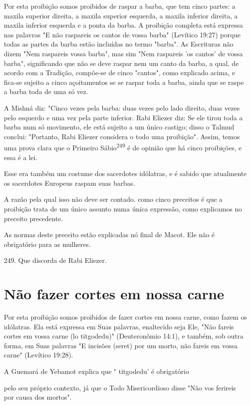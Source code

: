 \begin{itemize}
\begin{enumrate}
\begin{itemize}
\begin{itemize}
\begin{itemize}
Por esta proibição somos proibidos de raspar a barba, que tem cin­co
partes: a maxila superior direita, a maxila superior esquerda, a maxila
infe­rior direita, a maxila inferior esquerda e a ponta da barba. A
proibição comple­ta está expressa nas palavras "E não raspareis os
cantos de vossa barba" (Levíti­co 19:27) porque todas as partes da barba
estão incluídas no termo "barba". As Escrituras não dizem "Nem raspareis
vossa barba", mas sim "Nem raspareis 'os cantos' de vossa barba",
significando que não se deve raspar nem um canto da barba, a qual, de
acordo com a Tradição, compõe-se de cinco "cantos", co­mo explicado
acima, e fica-se sujeito a cinco açoitamentos se se raspar toda a barba,
ainda que se raspe a barba toda de uma só vez.

A Mishná diz: "Cinco vezes pela barba: duas vezes pelo lado direito,
duas vezes pelo esquerdo e uma vez pela parte inferior. Rabi Eliezer
diz: Se ele tirou toda a barba num só movimento, ele está sujeito a um
único castigo; disso o Talmud conclui: "Portanto, Rabi Eliezer considera
o todo uma proibição". Assim, temos uma prova clara que o Primeiro
Sábio\textsuperscript{249} é de opinião que há cin­co proibições, e essa
é a lei.

Esse era também um costume dos sacerdotes idólatras, e é sabido que
atualmente os sacerdotes Europeus raspam suas barbas.

A razão pela qual isso não deve ser contado. como cinco preceitos é que
a proibição trata de um único assunto numa única expressão, como
ex­plicamos no preceito precedente.

As normas deste preceito estão explicadas nó final de Macot. Ele não é
obrigatório para as mulheres.

249. Que discorda de Rabi Eliezer.

\section{Não fazer cortes em nossa carne}

Por esta proibição somos proibidos de fazer cortes em nossa carne, como
fazem os idólatras. Ela está expressa em Suas palavras, enaltecido seja
Ele, "Não fareis cortes em vossa carne (lo titgodedu)" (Deuteronômio
14:1), e tam­bém, sob outra forma, em Suas palavras "E incisões (seret)
por um morto, não fareis em vossa carne" (Levítico 19:28).

A Guemará de Yebamot explica que " titgodedu' é obrigatório

pelo seu próprio contexto, já que o Todo Misericordioso disse "Não vos
feri­reis por causa dos mortos".


\end{itemize}
\end{itemize}
\end{itemize}
\end{enumrate}
\end{itemize}
